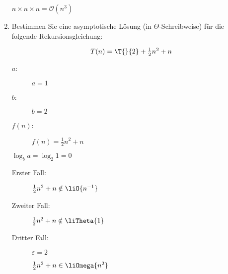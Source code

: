 \documentclass{lehramt-informatik-aufgabe}
\begin{document}
\begin{enumerate}
\begin{liAntwort}
$n \times n \times n = \mathcal{O}(n^3)$
\end{liAntwort}


\item Bestimmen Sie eine asymptotische Lösung (in $\Theta$-Schreibweise)
für die folgende Rekursionsgleichung:

\def\fn{\textstyle{\frac{1}{2}}n^2 + n}

\begin{displaymath}
T(n) = \T{}{2} + \fn
\end{displaymath}

\begin{liAntwort}

\liRekursionsGleichung

\begin{description}
\item[$a$:] $a = 1$
\item[$b$:] $b = 2$
\item[$f(n)$:] $f(n) = \fn$
\end{description}

$\log_b a = \log_2 1 = 0$

\begin{description}
\item[Erster Fall:]

\liBedingungEins

$\fn \notin \liO{n^{-1}}$

\item[Zweiter Fall:]

\liBedingungZwei

$\fn \notin \liTheta{1}$

\item[Dritter Fall:]

\liBedingungDrei

$\varepsilon = 2$

$\fn \in \liOmega{n^2}$
\end{description}

\end{liAntwort}

\end{enumerate}
\end{document}
